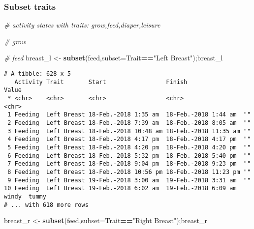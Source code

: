 \documentclass[10,portrait]{article}
\newenvironment{Shaded}{\begin{snugshade}}{\end{snugshade}}
\newcommand{\KeywordTok}[1]{\textcolor[rgb]{0.13,0.29,0.53}{\textbf{#1}}}
\newcommand{\DataTypeTok}[1]{\textcolor[rgb]{0.13,0.29,0.53}{#1}}
\newcommand{\StringTok}[1]{\textcolor[rgb]{0.31,0.60,0.02}{#1}}
\newcommand{\CommentTok}[1]{\textcolor[rgb]{0.56,0.35,0.01}{\textit{#1}}}
\newcommand{\OperatorTok}[1]{\textcolor[rgb]{0.81,0.36,0.00}{\textbf{#1}}}
\newcommand{\NormalTok}[1]{#1}
\begin{document}
\subsubsection{Subset traits}\label{subset-traits}

\begin{Shaded}
\begin{Highlighting}[]
\CommentTok{# activity states with traits: grow,feed,diaper,leisure}

\CommentTok{# grow}

\CommentTok{# feed}
\NormalTok{breast_l <-}\StringTok{ }\KeywordTok{subset}\NormalTok{(feed,}\DataTypeTok{subset=}\NormalTok{Trait}\OperatorTok{==}\StringTok{"Left Breast"}\NormalTok{);breast_l}
\end{Highlighting}
\end{Shaded}

\begin{verbatim}
# A tibble: 628 x 5
   Activity Trait       Start                 Finish                Value       
 * <chr>    <chr>       <chr>                 <chr>                 <chr>       
 1 Feeding  Left Breast 18-Feb.-2018 1:35 am  18-Feb.-2018 1:44 am  ""          
 2 Feeding  Left Breast 18-Feb.-2018 7:39 am  18-Feb.-2018 8:05 am  ""          
 3 Feeding  Left Breast 18-Feb.-2018 10:48 am 18-Feb.-2018 11:35 am ""          
 4 Feeding  Left Breast 18-Feb.-2018 4:17 pm  18-Feb.-2018 4:17 pm  ""          
 5 Feeding  Left Breast 18-Feb.-2018 4:20 pm  18-Feb.-2018 4:20 pm  ""          
 6 Feeding  Left Breast 18-Feb.-2018 5:32 pm  18-Feb.-2018 5:40 pm  ""          
 7 Feeding  Left Breast 18-Feb.-2018 9:04 pm  18-Feb.-2018 9:23 pm  ""          
 8 Feeding  Left Breast 18-Feb.-2018 10:56 pm 18-Feb.-2018 11:23 pm ""          
 9 Feeding  Left Breast 19-Feb.-2018 3:00 am  19-Feb.-2018 3:31 am  ""          
10 Feeding  Left Breast 19-Feb.-2018 6:02 am  19-Feb.-2018 6:09 am  windy  tummy
# ... with 618 more rows
\end{verbatim}

\begin{Shaded}
\begin{Highlighting}[]
\NormalTok{breast_r <-}\StringTok{ }\KeywordTok{subset}\NormalTok{(feed,}\DataTypeTok{subset=}\NormalTok{Trait}\OperatorTok{==}\StringTok{"Right Breast"}\NormalTok{);breast_r}
\end{Highlighting}
\end{Shaded}
\end{document}
